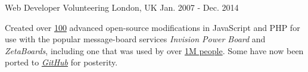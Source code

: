 \begin{cventries}
  \cventry
    {} %
    {Web Developer} %
    {Volunteering} %
    {London, UK} %
    {Jan. 2007 - Dec. 2014} %
    {
      \begin{cvitems} %
        \item {Created over \underline{100} advanced open-source modifications in JavaScript and PHP for use with the popular message-board services \textit{Invision Power Board} and \textit{ZetaBoards}, including one that was used by over \underline{1M people}. Some have now been ported to \href{https://github.com/KeirSimmons/ZetaBoards}{\emph{GitHub}} for posterity.}
      \end{cvitems}
    }



\end{cventries}